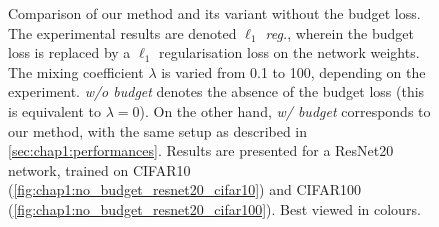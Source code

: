\begin{figure}
  \centering
  \caption{ Comparison of our method and its variant without the budget loss.
    The experimental results are denoted \emph{$\ell_1$ reg.}, wherein the budget
    loss is replaced by a $\ell_1$ regularisation loss on the network weights. The
    mixing coefficient $\lambda$ is varied from 0.1 to 100, depending on the
    experiment. \emph{w/o budget} denotes the absence of the budget loss (this
    is equivalent to $\lambda = 0$). On the other hand, \emph{w/ budget}
    corresponds to our method, with the same setup as described in
    \cref{sec:chap1:performances}. Results are presented for a ResNet20 network,
    trained on CIFAR10 (\cref{fig:chap1:no_budget_resnet20_cifar10}) and
    CIFAR100 (\cref{fig:chap1:no_budget_resnet20_cifar100}). Best viewed in
    colours.}
  \label{fig:chap1:no_budget_resnet20}
\end{figure}



